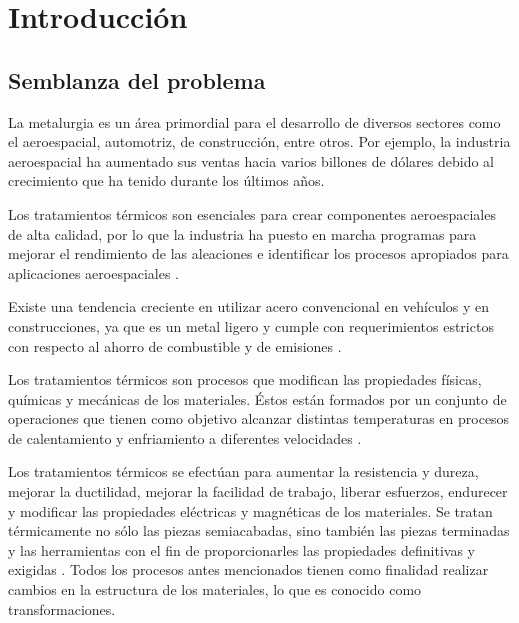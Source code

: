 
\chapter{Introducción} %
\label{ch:introduccion} 

\section{Semblanza del problema}

La metalurgia es un área primordial para el desarrollo de diversos sectores como el aeroespacial, automotriz, de construcción, entre otros. Por ejemplo, la industria aeroespacial ha aumentado sus ventas hacia varios billones de dólares debido al crecimiento que ha tenido durante los últimos años.

Los tratamientos térmicos son esenciales para crear componentes aeroespaciales de alta calidad, por lo que
la industria ha puesto en marcha programas para mejorar el rendimiento de las aleaciones e identificar los procesos apropiados para aplicaciones aeroespaciales \cite{BREWER1998}.

Existe una tendencia creciente en utilizar acero convencional en vehículos y en construcciones, ya que es un metal ligero y cumple con requerimientos estrictos con respecto al ahorro de combustible y de emisiones  \cite{cole1995light}.
 




Los tratamientos térmicos son procesos que modifican las propiedades físicas, químicas y mecánicas de los materiales. 
Éstos están formados por un conjunto de operaciones que tienen como objetivo alcanzar distintas temperaturas en procesos de calentamiento y enfriamiento a diferentes velocidades \cite{moleraTratamientosMarcomo}.
 
Los tratamientos térmicos se efectúan para aumentar la resistencia y dureza, mejorar la ductilidad, mejorar la facilidad de trabajo, liberar esfuerzos, endurecer  y modificar las propiedades eléctricas y magnéticas de los materiales.
Se tratan térmicamente no sólo las piezas semiacabadas, %
sino también las piezas terminadas y las herramientas con el fin de proporcionarles las propiedades definitivas y exigidas \cite{TratamientosAcerosTesis}.
Todos los procesos  antes mencionados tienen como finalidad realizar cambios en la estructura de los materiales, lo que es conocido como transformaciones.


